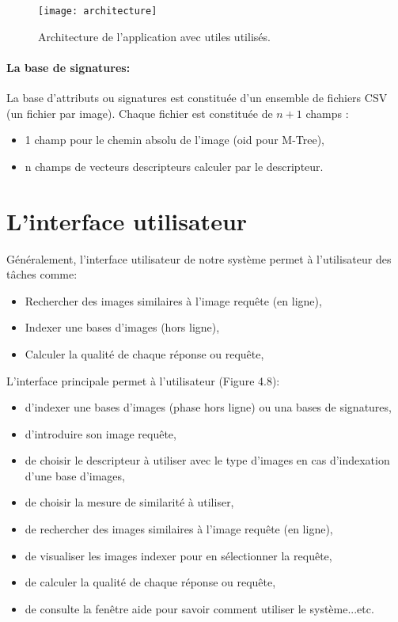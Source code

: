 \begin{figure}[H]
	\centering
	\texttt{[image: architecture]} 
	\caption{Architecture de l’application avec utiles utilisés.}
\end{figure}
\paragraph{La base de signatures:}
La base d’attributs ou signatures est constituée d’un ensemble de fichiers CSV (un fichier par image). Chaque fichier est constituée de $ n+1 $ champs :
\begin{itemize}
	\item 1 champ pour le chemin absolu de l'image (oid pour M-Tree),
	\item n champs de vecteurs descripteurs calculer par le descripteur.
\end{itemize}
\section{L’interface utilisateur }
Généralement, l'interface utilisateur de notre système permet à l'utilisateur des tâches comme:
 \begin{itemize}
 	\item Rechercher des images similaires à l'image requête (en ligne),
 	\item Indexer une bases d'images (hors ligne),
 	\item Calculer la qualité de chaque réponse ou requête,
 \end{itemize}

L'interface principale permet à l’utilisateur (Figure 4.8): 
\begin{itemize}
	\item d'indexer une bases d'images (phase hors ligne) ou una bases de signatures,
	\item d’introduire son image requête,
	\item de choisir le descripteur à utiliser avec le type d'images en cas d'indexation d'une base d'images,
	\item de choisir la mesure de similarité à utiliser,
	\item de rechercher des images similaires à l'image requête (en ligne),
	\item de visualiser les images indexer pour en sélectionner la requête,
	\item de calculer la qualité de chaque réponse ou requête,
	\item de consulte la fenêtre aide pour savoir comment utiliser le système...etc.
\end{itemize}

